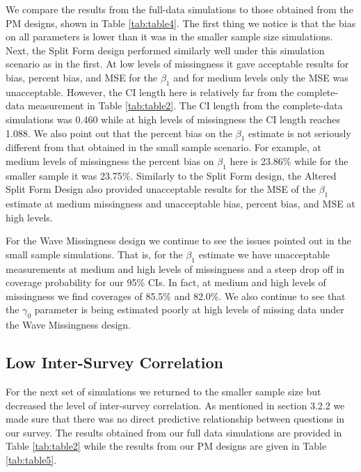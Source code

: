 \documentclass{svjour3}                     %
\begin{document}
We compare the results from the full-data simulations to those obtained from the PM designs, shown in Table \ref{tab:table4}. The first thing we notice is that the bias on all parameters is lower than it was in the smaller sample size simulations. Next, the Split Form design performed similarly well under this simulation scenario as in the first. At low levels of missingness it gave acceptable results for bias, percent bias, and MSE for the $\beta_1$ and for medium levels only the MSE was unacceptable. However, the CI length here is relatively far from the complete-data measurement in Table \ref{tab:table2}. The CI length from the complete-data simulations was 0.460 while at high levels of missingness the CI length reaches 1.088. We also point out that the percent bias on the $\beta_1$ estimate is not seriously different from that obtained in the small sample scenario. For example, at medium levels of missingness the percent bias on $\beta_1$ here is 23.86\% while for the smaller sample it was 23.75\%.
Similarly to the Split Form design, the Altered Split Form Design also provided unacceptable results for the MSE of the $\beta_1$ estimate at medium missingness and unacceptable bias, percent bias, and MSE at high levels.  \par
For the Wave Missingness design we continue to see the issues pointed out in the small sample simulations. That is, for the $\beta_1$ estimate we have unacceptable measurements at medium and high levels of missingness and a steep drop off in coverage probability for our 95\% CIs. In fact, at medium and high levels of missingness we find coverages of 85.5\% and 82.0\%. We also continue to see that the $\gamma_0$ parameter is being estimated poorly at high levels of missing data under the Wave Missingness design. \par


\subsection{Low Inter-Survey Correlation}
\label{sec:3.3}
For the next set of simulations we returned to the smaller sample size but decreased the level of inter-survey correlation. As mentioned in section 3.2.2 we made sure that there was no direct predictive relationship between questions in our survey. The results obtained from our full data simulations are provided in Table \ref{tab:table2} while the results from our PM designs are given in Table \ref{tab:table5}. \par
\end{document}
